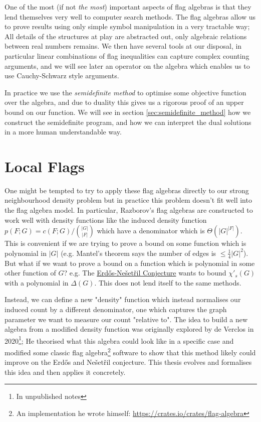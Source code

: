 One of the most (if not \textit{the most}) important aspects of flag algebras is that
they lend themselves very well to computer search methods.
The flag algebras allow us to prove results using only simple symbol manipulation in a very
tractable way; All details of the structures at play are abstracted out, only algebraic relations
between real numbers remains. We then have several tools at our disposal, in particular
linear combinations of flag inequalities can capture complex counting arguments, and
we will see later an operator on the algebra which enables us to use Cauchy-Schwarz style
arguments.

In practice we use the \textit{semidefinite method} to optimise some objective function
over the algebra, and due to duality this gives us a rigorous proof of an upper bound on our
function.
We will see in section \ref{sec:semidefinite_method} how we construct the semidefinite program,
and how we can interpret the dual solutions in a more human understandable way.

\section*{Local Flags}

One might be tempted to try to apply these flag algebras directly to our strong neighbourhood
density problem but in practice this problem doesn't fit well into the flag algebra model.
In particular, Razborov's flag algebras are constructed to work well with density functions
like the induced density function $p(F; G) = c(F; G)/\binom{|G|}{|F|}$ which have a
denominator which is $\Theta(|G|^{|F|})$. This is convenient if we are trying to prove
a bound on some function which is polynomial in $|G|$
(e.g. Mantel's theorem says the number of edges is $\leq \frac{1}{4}|G|^2$). But what if
we want to prove a bound on a function which is polynomial in some other function
of $G$? e.g. The \hyperref[conj:intro_erdos_nesetril]{Erd\H{o}s-Nešetřil Conjecture}
wants to bound $\chi'_s(G)$ with a polynomial in $\Delta(G).$ This does not lend itself
to the same methods.

Instead, we can define a new "density" function which instead normalises our induced
count by a different denominator, one which captures the graph parameter we want to measure
our count "relative to". The idea to build a new algebra from a modified density function was
originally explored by de Verclos in 2020\footnote{In unpublished notes}; He theorised what this
algebra could look like in a specific case and modified some classic flag algebra\footnote{An
implementation he wrote himself: \url{https://crates.io/crates/flag-algebra}} software to show that this method likely could improve on the
Erd\H{o}s and Nešetřil conjecture. This thesis evolves and formalises this idea and
then applies it concretely.


